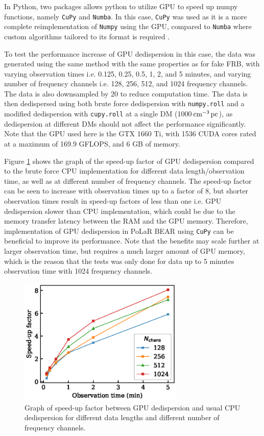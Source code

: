 In Python, two packages allows python to utilize GPU to speed up numpy functions, namely \texttt{CuPy} and \texttt{Numba}. In this case, \texttt{CuPy} was used as it is a more complete reimplementation of \texttt{Numpy} using the GPU, compared to \texttt{Numba} where custom algorithms tailored to its format is required \cite{Okuta2017}.

To test the performance increase of GPU dedispersion in this case, the data was generated using the same method with the same properties as for fake FRB, with varying observation times i.e. 0.125, 0.25, 0.5, 1, 2, and 5 minutes, and varying number of frequency channels i.e. 128, 256, 512, and 1024 frequency channels. The data is also downsampled by 20 to reduce computation time. The data is then dedispersed using both brute force dedispersion with \texttt{numpy.roll} and a modified dedispersion with \texttt{cupy.roll} at a single DM (1000$\,\text{cm}^{-3}\,\text{pc}$), as dedispersion at different DMs should not affect the performance significantly. Note that the GPU used here is the GTX 1660 Ti, with 1536 CUDA cores rated at a maximum of 169.9 GFLOPS, and 6 GB of memory. 

Figure \ref{fig:gpu} shows the graph of the speed-up factor of GPU dedispersion compared to the brute force CPU implementation for different data length/observation time, as well as at different number of frequency channels. The speed-up factor can be seen to increase with observation times up to a factor of 8, but shorter observation times result in speed-up factors of less than one i.e. GPU dedispersion slower than CPU implementation, which could be due to the memory transfer latency between the RAM and the GPU memory. Therefore, implementation of GPU dedispersion in PoLaR BEAR using \texttt{CuPy} can be beneficial to improve its performance. Note that the benefits may scale further at larger observation time, but requires a much larger amount of GPU memory, which is the reason that the tests was only done for data up to 5 minutes observation time with 1024 frequency channels. 

\begin{figure}
    \centering
    \includegraphics[width=0.7\textwidth]{Graphs/gpu.eps}
    \caption[Speed-up factor for GPU dedispersion]{Graph of speed-up factor between GPU dedispersion and usual CPU dedispersion for different data lengths and different number of frequency channels.}
    \label{fig:gpu}
\end{figure}

